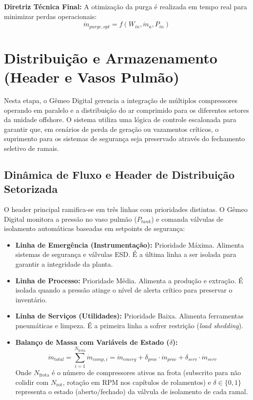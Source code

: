 \documentclass[12pt,a4paper]{article}
\numberwithin{equation}{section}
\numberwithin{table}{section}
\numberwithin{figure}{section}
\begin{document}
		\textbf{Diretriz Técnica Final:} A otimização da purga é realizada em tempo real para minimizar perdas operacionais:
		\begin{equation}\label{eq:s15-8}
\boxed{\dot{m}_{purge,opt} = f(W_{in}, \dot{m}_a, P_{in})}
\end{equation}
	
	
\section{Distribuição e Armazenamento (Header e Vasos Pulmão)}

Nesta etapa, o Gêmeo Digital gerencia a integração de múltiplos compressores operando em paralelo e a distribuição do ar comprimido para os diferentes setores da unidade offshore. O sistema utiliza uma lógica de controle escalonada para garantir que, em cenários de perda de geração ou vazamentos críticos, o suprimento para os sistemas de segurança seja preservado através do fechamento seletivo de ramais.

\subsection{Dinâmica de Fluxo e Header de Distribuição Setorizada}

O header principal ramifica-se em três linhas com prioridades distintas. O Gêmeo Digital monitora a pressão no vaso pulmão ($P_{tank}$) e comanda válvulas de isolamento automáticas baseadas em setpoints de segurança:

\begin{itemize}
	\item \textbf{Linha de Emergência (Instrumentação):} Prioridade Máxima. Alimenta sistemas de segurança e válvulas ESD. É a última linha a ser isolada para garantir a integridade da planta.
	\item \textbf{Linha de Processo:} Prioridade Média. Alimenta a produção e extração. É isolada quando a pressão atinge o nível de alerta crítico para preservar o inventário.
	\item \textbf{Linha de Serviços (Utilidades):} Prioridade Baixa. Alimenta ferramentas pneumáticas e limpeza. É a primeira linha a sofrer restrição (\textit{load shedding}).
	\item \textbf{Balanço de Massa com Variáveis de Estado ($\delta$):}
	\begin{equation}\label{eq:s16-1}
\dot{m}_{total} = \sum_{i=1}^{N_{\text{frota}}} \dot{m}_{comp,i} = \dot{m}_{emerg} + \delta_{proc} \cdotp \dot{m}_{proc} + \delta_{serv} \cdotp \dot{m}_{serv}
\end{equation}
	Onde $N_{\text{frota}}$ é o número de compressores ativos na frota (subscrito para não colidir com $N_{\text{rot}}$, rotação em RPM nos capítulos de rolamentos) e $\delta \in \{0, 1\}$ representa o estado (aberto/fechado) da válvula de isolamento de cada ramal.
\end{itemize}
\end{document}
